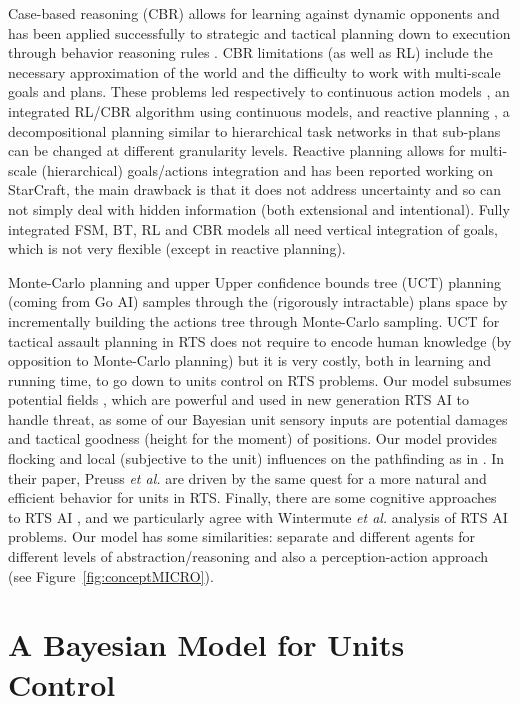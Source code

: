 Case-based reasoning (CBR) allows for learning against dynamic opponents \citep{LTW} and has been applied successfully to strategic and tactical planning down to execution through behavior reasoning rules \citep{Ontanon2007}. CBR limitations (as well as RL) include the necessary approximation of the world and the difficulty to work with multi-scale goals and plans. These problems led respectively to continuous action models \citep{Molineaux08}, an integrated RL/CBR algorithm using continuous models, and reactive planning \citep{WeberCIG10}, a decompositional planning similar to hierarchical task networks in that sub-plans can be changed at different granularity levels. Reactive planning allows for multi-scale (hierarchical) goals/actions integration and has been reported working on StarCraft, the main drawback is that it does not address uncertainty and so can not simply deal with hidden information (both extensional and intentional). 
Fully integrated FSM, BT, RL and CBR models all need vertical integration of goals, which is not very flexible (except in reactive planning).

Monte-Carlo planning \citep{Chung05} and upper Upper 
confidence bounds tree (UCT) planning (coming from Go AI) \citep{UCT} 
 samples through the (rigorously intractable) plans space by 
incrementally building the actions tree through Monte-Carlo sampling. 
UCT for tactical assault planning \citep{UCT} in RTS does not require to encode human knowledge (by opposition to Monte-Carlo planning) but it is very costly, both in learning and running time, to go down to units control on RTS problems. 
Our model subsumes potential fields \citep{Hagelback2009}, which are powerful and used in new generation RTS AI to handle threat, as some of our Bayesian unit sensory inputs are potential damages and tactical goodness (height for the moment) of positions. Our model provides flocking and local (subjective to the unit) influences on the pathfinding as in \citep{teamCompositionRTS}. In their paper, Preuss \textit{et al.} are driven by the same quest for a more natural and efficient behavior for units in RTS. Finally, there are some cognitive approaches to RTS AI \citep{SORTS}, and we particularly agree with Wintermute \textit{et al.} analysis of RTS AI problems. Our model has some similarities: separate and different agents for different levels of abstraction/reasoning and also a perception-action approach (see Figure~\ref{fig:conceptMICRO}).


\section{A Bayesian Model for Units Control}

